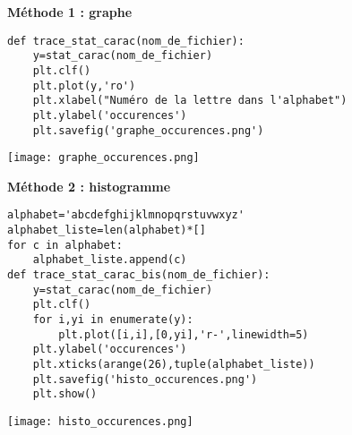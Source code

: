 \begin{minipage}{0.5\textwidth}
\textbf{Méthode 1 : graphe}

\begin{lstlisting}
def trace_stat_carac(nom_de_fichier):
    y=stat_carac(nom_de_fichier)
    plt.clf()
    plt.plot(y,'ro')
    plt.xlabel("Numéro de la lettre dans l'alphabet")
    plt.ylabel('occurences')
    plt.savefig('graphe_occurences.png')
\end{lstlisting}

\end{minipage}
\begin{minipage}{0.5\textwidth}
\begin{center}
\texttt{[image: graphe\_occurences.png]}
\end{center}
\end{minipage}

\begin{minipage}{0.5\textwidth}
\textbf{Méthode 2 : histogramme}

\begin{lstlisting}
alphabet='abcdefghijklmnopqrstuvwxyz'
alphabet_liste=len(alphabet)*[]
for c in alphabet:
    alphabet_liste.append(c)
def trace_stat_carac_bis(nom_de_fichier):
    y=stat_carac(nom_de_fichier)
    plt.clf()
    for i,yi in enumerate(y):
        plt.plot([i,i],[0,yi],'r-',linewidth=5)
    plt.ylabel('occurences')
    plt.xticks(arange(26),tuple(alphabet_liste))
    plt.savefig('histo_occurences.png')
    plt.show()
\end{lstlisting}

\end{minipage}
\begin{minipage}{0.5\textwidth}
\begin{center}
\texttt{[image: histo\_occurences.png]}
\end{center}
\end{minipage}
